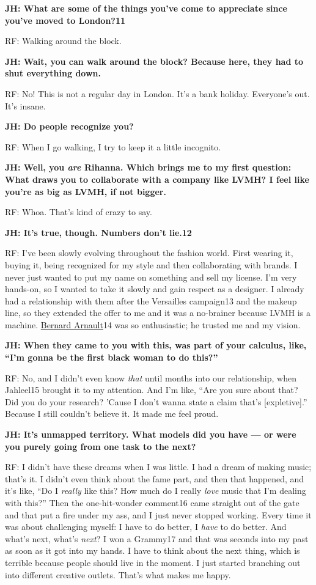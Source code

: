 \textbf{JH: What are some of the things you've come to appreciate since
you've moved to London?11}

RF: Walking around the block.

\textbf{JH: Wait, you can walk around the block? Because here, they had
to shut everything down.}

RF: No! This is not a regular day in London. It's a bank holiday.
Everyone's out. It's insane.

\textbf{JH: Do people recognize you?}

RF: When I go walking, I try to keep it a little incognito.

\textbf{JH: Well, you \emph{are} Rihanna. Which brings me to my first
question: What draws you to collaborate with a company like LVMH? I feel
like you're as big as LVMH, if not bigger.}

RF: Whoa. That's kind of crazy to say.

\textbf{JH: It's true, though. Numbers don't lie.12}

RF: I've been slowly evolving throughout the fashion world. First
wearing it, buying it, being recognized for my style and then
collaborating with brands. I never just wanted to put my name on
something and sell my license. I'm very hands-on, so I wanted to take it
slowly and gain respect as a designer. I already had a relationship with
them after the Versailles campaign13 and the makeup line, so they
extended the offer to me and it was a no-brainer because LVMH is a
machine.
\href{https://www.nytimes3xbfgragh.onion/topic/person/bernard-arnault}{Bernard
Arnault}14 was so enthusiastic; he trusted me and my vision.

\textbf{JH: When they came to you with this, was part of your calculus,
like, ``I'm gonna be the first black woman to do this?''}

RF: No, and I didn't even know \emph{that} until months into our
relationship, when Jahleel15 brought it to my attention. And I'm like,
``Are you sure about that? Did you do your research? 'Cause I don't
wanna state a claim that's {[}expletive{]}.'' Because I still couldn't
believe it. It made me feel proud.

\textbf{JH: It's unmapped territory. What models did you have --- or
were you purely going from one task to the next?}

RF: I didn't have these dreams when I was little. I had a dream of
making music; that's it. I didn't even think about the fame part, and
then that happened, and it's like, ``Do I \emph{really} like this? How
much do I really \emph{love} music that I'm dealing with this?'' Then
the one-hit-wonder comment16 came straight out of the gate and that put
a fire under my ass, and I just never stopped working. Every time it was
about challenging myself: I have to do better, I \emph{have} to do
better. And what's next, what's \emph{next}? I won a Grammy17 and that
was seconds into my past as soon as it got into my hands. I have to
think about the next thing, which is terrible because people should live
in the moment. I just started branching out into different creative
outlets. That's what makes me happy.

